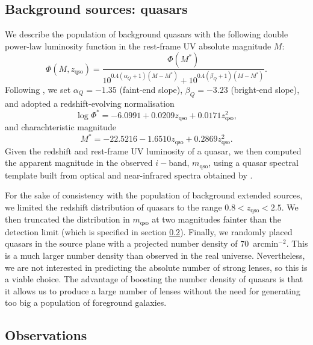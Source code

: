 \documentclass{aa}
\def\zqso{z_{\mathrm{qso}}}
\def\mqso{m_{\mathrm{qso}}}
\begin{document}
\subsection{Background sources: quasars}\label{ssec:quasars}

We describe the population of background quasars with the following double power-law luminosity function in the rest-frame UV absolute magnitude $M$:
\begin{equation}
\Phi(M,\zqso) = \dfrac{\Phi(M^*)}{10^{0.4(\alpha_Q+1)(M - M^*)} + 10^{0.4(\beta_Q+1)(M - M^*)}}.
\end{equation}
Following \citet{Man++17}, we set $\alpha_Q=-1.35$ (faint-end slope), $\beta_Q=-3.23$ (bright-end slope), and adopted a redshift-evolving normalisation
\begin{equation}
\log{\Phi^*} = -6.0991 + 0.0209\zqso + 0.0171\zqso^2,
\end{equation}
and charachteristic magnitude
\begin{equation}
M^* = -22.5216 - 1.6510\zqso + 0.2869\zqso^2.
\end{equation}
Given the redshift and rest-frame UV luminosity of a quasar, we then computed the apparent magnitude in the observed $i-$band, $\mqso$, using a quasar spectral template built from optical and near-infrared spectra obtained by \citet{vdB++01,Gli++06}.

For the sake of consistency with the population of background extended sources, we limited the redshift distribution of quasars to the range $0.8 < \zqso < 2.5$.
We then truncated the distribution in $\mqso$ at two magnitudes fainter than the detection limit (which is specified in section \ref{ssub:obs}).
Finally, we randomly placed quasars in the source plane with a projected number density of $70$~arcmin$^{-2}$. This is a much larger number density than observed in the real universe. Nevertheless, we are not interested in predicting the absolute number of strong lenses, so this is a viable choice. The advantage of boosting the number density of quasars is that it allows us to produce a large number of lenses without the need for generating too big a population of foreground galaxies.


\subsection{Observations}\label{ssub:obs}
\end{document}

